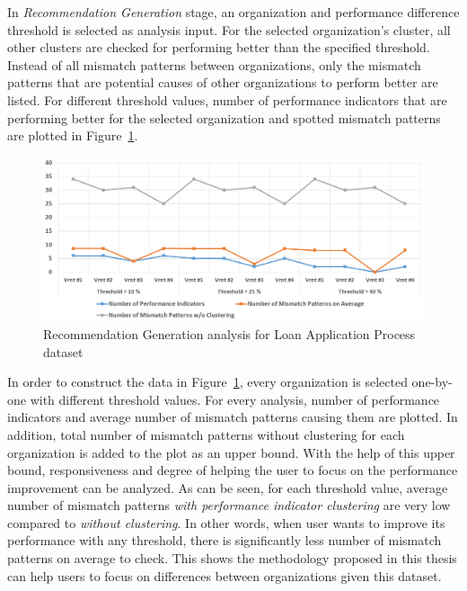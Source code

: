 In \textit{Recommendation Generation} stage, an organization and performance difference threshold is selected as analysis input. For the selected organization's cluster, all other clusters are checked for performing better than the specified threshold. Instead of all mismatch patterns between organizations, only the mismatch patterns that are potential causes of other organizations to perform better are listed. For different threshold values, number of performance indicators that are performing better for the selected organization and spotted mismatch patterns are plotted in Figure~\ref{fig:loan-recommendation-generation-analysis}. 
\begin{figure}
	\centering
	\includegraphics[width=\textwidth]{5_results_discussions/loan-application-process/recommendation-generation-analysis}
	\caption{Recommendation Generation analysis for Loan Application Process dataset}
  \label{fig:loan-recommendation-generation-analysis}
\end{figure}
In order to construct the data in Figure~\ref{fig:loan-recommendation-generation-analysis}, every organization is selected one-by-one with different threshold values. For every analysis, number of performance indicators and average number of mismatch patterns causing them are plotted. In addition, total number of mismatch patterns without clustering for each organization is added to the plot as an upper bound. With the help of this upper bound, responsiveness and degree of helping the user to focus on the performance improvement can be analyzed. As can be seen, for each threshold value, average number of mismatch patterns \textit{with performance indicator clustering} are very low compared to \textit{without clustering}. In other words, when user wants to improve its performance with any threshold, there is significantly less number of mismatch patterns on average to check. This shows the methodology proposed in this thesis can help users to focus on differences between organizations given this dataset. 